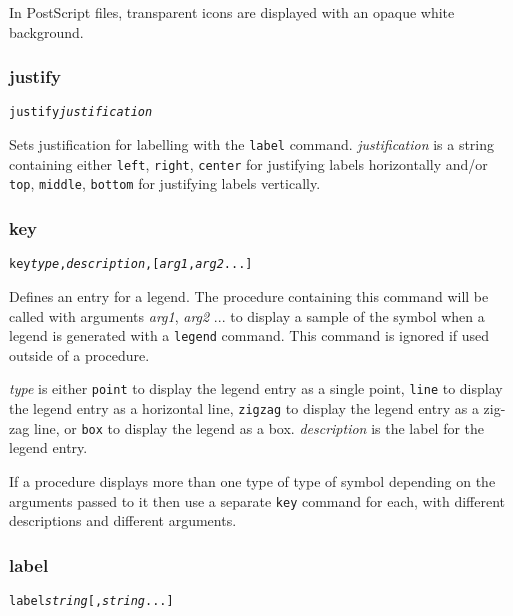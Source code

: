 In PostScript files, transparent icons are displayed with an opaque
white background.

\subsubsection{justify}

\begin{alltt}
justify \textit{justification}
\end{alltt}

Sets justification for labelling with the \texttt{label} command.
\textit{justification} is a string containing either
\texttt{left}, \texttt{right}, \texttt{center} for justifying labels
horizontally and/or
\texttt{top}, \texttt{middle}, \texttt{bottom} for justifying labels
vertically.

\subsubsection{key}

\begin{alltt}
key \textit{type}, \textit{description}, [\textit{arg1}, \textit{arg2} ...]
\end{alltt}

Defines an entry for a legend.  The procedure containing this command will be
called with arguments \textit{arg1}, \textit{arg2} ... to display a sample of
the symbol when a legend is generated with a \texttt{legend} command.  This
command is ignored if used outside of a procedure.

\textit{type} is either
\texttt{point} to display the legend entry as a single point,
\texttt{line} to display the legend entry as a horizontal line,
\texttt{zigzag} to display the legend entry as a zig-zag line,
or
\texttt{box} to display the legend as a box.
\textit{description} is the label for the legend entry.

If a procedure displays more than one type of type of symbol depending
on the arguments passed to it then use a separate
\texttt{key} command for each, with different descriptions
and different arguments.

\subsubsection{label}

\begin{alltt}
label \textit{string} [, \textit{string} ...]
\end{alltt}


